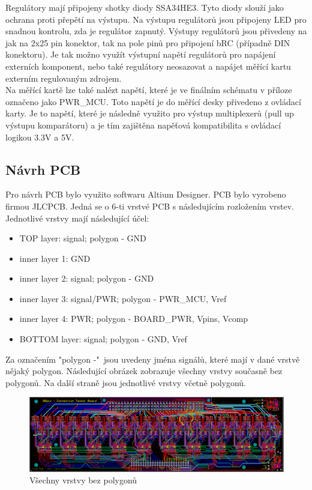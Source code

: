 Regulátory mají připojeny shotky diody SSA34HE3. Tyto diody slouží jako ochrana proti přepětí na výstupu.
Na výstupu regulátorů jsou připojeny LED pro snadnou kontrolu, zda je regulátor zapnutý.
Výstupy regulátorů jsou přivedeny na jak na 2x25 pin konektor, tak na pole pinů pro připojení bRC (případně DIN konektoru).
Je tak možno využít výstupní napětí regulátorů pro napájení externích komponent, nebo
také regulátory neosazovat a napájet měřící kartu externím regulovaným zdrojem.\\

Na měřící kartě lze také nalézt napětí, které je ve finálním schématu v příloze označeno jako PWR\_MCU.
Toto napětí je do měřící desky přivedeno z ovládací karty. Je to napětí, které je následně využito
pro výstup multiplexerů (pull up výstupu komparátoru) a je tím zajištěna napěťová kompatibilita s ovládací logikou 3.3V a 5V.


\subsection{Návrh PCB}
Pro návrh PCB bylo využito softwaru Altium Designer. PCB bylo vyrobeno firmou
JLCPCB.
Jedná se o 6-ti vrstvé PCB s následujícím rozložením vrstev.
Jednotlivé vrstvy mají následující účel:
\begin{itemize}
    \item TOP layer: signal; polygon - GND
    \item inner layer 1: GND
    \item inner layer 2: signal; polygon - GND
    \item inner layer 3: signal/PWR; polygon - PWR\_MCU, Vref
    \item inner layer 4: PWR; polygon - BOARD\_PWR, Vpins, Vcomp
    \item BOTTOM layer: signal; polygon - GND, Vref
\end{itemize}

\noindent Za označením "polygon -"\ jsou uvedeny jména signálů, které mají v dané vrstvě nějaký polygon.
Následující obrázek zobrazuje všechny vrstvy současně bez polygonů. Na další straně jsou jednotlivé vrstvy
včetně polygonů.

\begin{figure}[ht!]
    \centering
    \includegraphics[width = 1\textwidth]{obrazky/all_layers_no_poly.png}
    \caption{Všechny vrstvy bez polygonů}
    \label{fig:Všechny vrstvy bez polygonů}
\end{figure}
\clearpage

